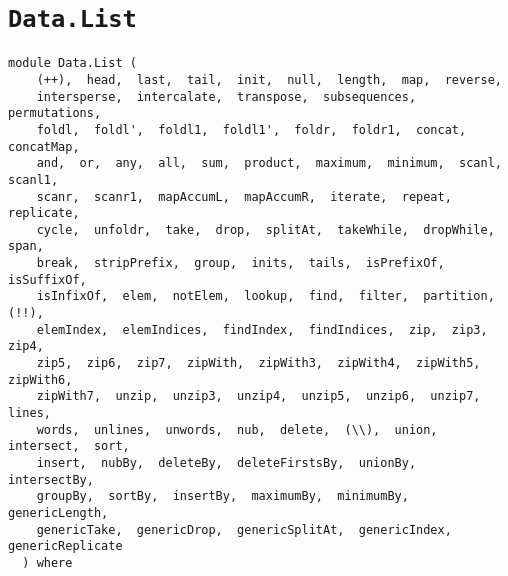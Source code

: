 \chapter{\texttt{Data.List}}
\label{module:Data.List}
\haddockbeginheader
{\haddockverb\begin{verbatim}
module Data.List (
    (++),  head,  last,  tail,  init,  null,  length,  map,  reverse, 
    intersperse,  intercalate,  transpose,  subsequences,  permutations, 
    foldl,  foldl',  foldl1,  foldl1',  foldr,  foldr1,  concat,  concatMap, 
    and,  or,  any,  all,  sum,  product,  maximum,  minimum,  scanl,  scanl1, 
    scanr,  scanr1,  mapAccumL,  mapAccumR,  iterate,  repeat,  replicate, 
    cycle,  unfoldr,  take,  drop,  splitAt,  takeWhile,  dropWhile,  span, 
    break,  stripPrefix,  group,  inits,  tails,  isPrefixOf,  isSuffixOf, 
    isInfixOf,  elem,  notElem,  lookup,  find,  filter,  partition,  (!!), 
    elemIndex,  elemIndices,  findIndex,  findIndices,  zip,  zip3,  zip4, 
    zip5,  zip6,  zip7,  zipWith,  zipWith3,  zipWith4,  zipWith5,  zipWith6, 
    zipWith7,  unzip,  unzip3,  unzip4,  unzip5,  unzip6,  unzip7,  lines, 
    words,  unlines,  unwords,  nub,  delete,  (\\),  union,  intersect,  sort, 
    insert,  nubBy,  deleteBy,  deleteFirstsBy,  unionBy,  intersectBy, 
    groupBy,  sortBy,  insertBy,  maximumBy,  minimumBy,  genericLength, 
    genericTake,  genericDrop,  genericSplitAt,  genericIndex,  genericReplicate
  ) where\end{verbatim}}
\haddockendheader

